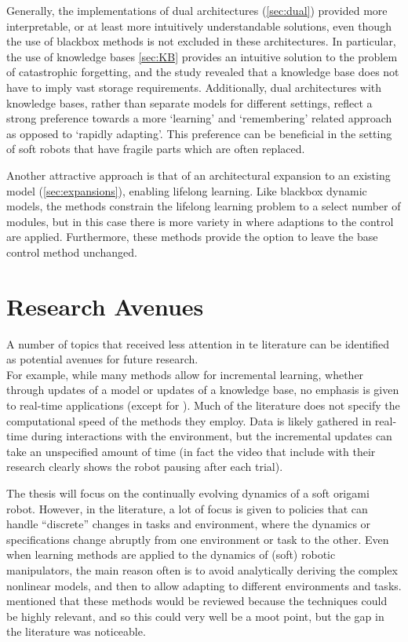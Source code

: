 Generally, the implementations of dual architectures (\cref{sec:dual}) provided more interpretable, or at least more intuitively understandable solutions, even though the use of blackbox methods is not excluded in these architectures.
In particular, the use of knowledge bases \cref{sec:KB} provides an intuitive solution to the problem of catastrophic forgetting, and the study revealed that a knowledge base does not have to imply vast storage requirements.
Additionally, dual architectures with knowledge bases, rather than separate models for different settings, reflect a strong preference towards a more `learning' and `remembering' related approach as opposed to `rapidly adapting'.
This preference can be beneficial in the setting of soft robots that have fragile parts which are often replaced.

Another attractive approach is that of an architectural expansion to an existing model (\cref{sec:expansions}), enabling lifelong learning.
Like blackbox dynamic models, the methods constrain the lifelong learning problem to a select number of modules, but in this case there is more variety in where adaptions to the control are applied.
Furthermore, these methods provide the option to leave the base control method unchanged.


\section{Research Avenues}\label{sec:research-gap}
A number of topics that received less attention in te literature can be identified as potential avenues for future research.\\
For example, while many methods allow for incremental learning, whether through updates of a model or updates of a knowledge base, no emphasis is given to real-time applications (except for \textcite{Nguyen2011}).
Much of the literature does not specify the computational speed of the methods they employ.
Data is likely gathered in real-time during interactions with the environment, but the incremental updates can take an unspecified amount of time (in fact the video that \textcite{Chatzilygeroudis2016} include with their research clearly shows the robot pausing after each trial).

The thesis will focus on the continually evolving dynamics of a soft origami robot.
However, in the literature, a lot of focus is given to policies that can handle ``discrete'' changes in tasks and environment, where the dynamics or specifications change abruptly from one environment or task to the other.
Even when learning methods are applied to the dynamics of (soft) robotic manipulators, the main reason often is to avoid analytically deriving the complex nonlinear models, and then to allow adapting to different environments and tasks.
 mentioned that these methods would be reviewed because the techniques could be highly relevant, and so this could very well be a moot point, but the gap in the literature was noticeable.

